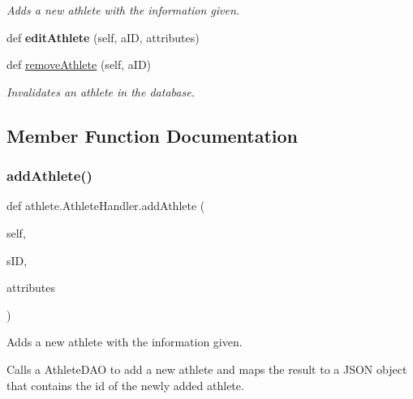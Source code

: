 \begin{DoxyCompactItemize}
\begin{DoxyCompactList}\small\item\em Adds a new athlete with the information given. \end{DoxyCompactList}\item 
\mbox{\label{classathlete_1_1_athlete_handler_a10d2714dd0621403eced252491c4207e}} 
def {\bfseries edit\+Athlete} (self, a\+ID, attributes)
\item 
def \hyperlink{classathlete_1_1_athlete_handler_afb7403e77cd06eef441c69e77c95e276}{remove\+Athlete} (self, a\+ID)
\begin{DoxyCompactList}\small\item\em Invalidates an athlete in the database. \end{DoxyCompactList}\end{DoxyCompactItemize}


\subsection{Member Function Documentation}
\mbox{\label{classathlete_1_1_athlete_handler_a18c945d36c0ef6745bdeeba41ae16656}} 
\subsubsection{\texorpdfstring{add\+Athlete()}{addAthlete()}}
{\footnotesize\ttfamily def athlete.\+Athlete\+Handler.\+add\+Athlete (\begin{DoxyParamCaption}\item[{}]{self,  }\item[{}]{s\+ID,  }\item[{}]{attributes }\end{DoxyParamCaption})}



Adds a new athlete with the information given. 

Calls a Athlete\+D\+AO to add a new athlete and maps the result to a J\+S\+ON object that contains the id of the newly added athlete.


